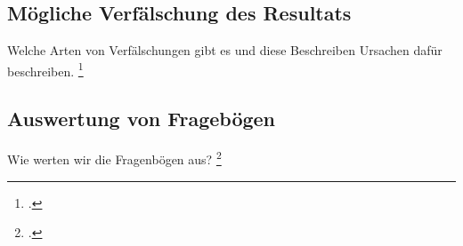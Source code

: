 \subsection{Mögliche Verfälschung des Resultats}
Welche Arten von Verfälschungen gibt es und diese Beschreiben
Ursachen dafür beschreiben. \footcite{Einfuehrung in die Test- und Fragebogenkonstruktion}

\subsection{Auswertung von Fragebögen}
Wie werten wir die Fragenbögen aus? \footcite{Interview und schriftliche Befragung}


